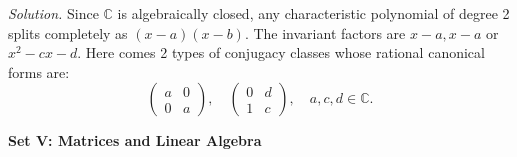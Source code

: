 \documentclass{mathproblems}
\newcommand\C{\mathbb{C}}
\begin{document}
\begin{questions}

\textit{Solution.} Since $\C$ is algebraically closed, any characteristic polynomial of degree 2 splits completely as $(x-a)(x-b)$. The invariant factors are $x-a,x-a$ or $x^2-c x-d$. Here comes 2 types of conjugacy classes whose rational canonical forms are:
$$
\begin{pmatrix}
a & 0 \\
0 & a
\end{pmatrix}, \quad
\begin{pmatrix}
0 & d \\
1 & c
\end{pmatrix},\quad a,c,d\in \C.
$$

\end{questions}

\newpage

\centerline{\textbf{Set V: Matrices and Linear Algebra}}
\end{document}
